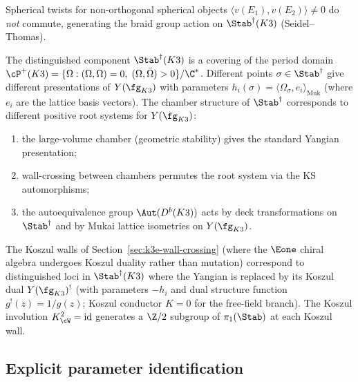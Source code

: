 Spherical twists for non-orthogonal spherical objects $\langle v(E_1), v(E_2) \rangle \neq 0$ do \emph{not} commute, generating the braid group action on $\Stab^\dagger(K3)$ (Seidel--Thomas).

\begin{conjecture}
\label{conj:stab-yangian-parameter}
\ClaimStatusConjectured
The distinguished component $\Stab^\dagger(K3)$ is a covering of the period domain $\cP^+(K3) = \{\Omega : (\Omega, \Omega) = 0, \; (\Omega, \bar\Omega) > 0\}/\C^*$. Different points $\sigma \in \Stab^\dagger$ give different presentations of $Y(\fg_{K3})$ with parameters $h_i(\sigma) = \langle \Omega_\sigma, e_i \rangle_{\mathrm{Muk}}$ (where $e_i$ are the lattice basis vectors). The chamber structure of $\Stab^\dagger$ corresponds to different positive root systems for $Y(\fg_{K3})$:
\begin{enumerate}[label=(\roman*)]
\item the large-volume chamber (geometric stability) gives the standard Yangian presentation;
\item wall-crossing between chambers permutes the root system via the KS automorphisms;
\item the autoequivalence group $\Aut(D^b(K3))$ acts by deck transformations on $\Stab^\dagger$ and by Mukai lattice isometries on $Y(\fg_{K3})$.
\end{enumerate}
\end{conjecture}

\begin{remark}
\label{rem:bridgeland-koszul-walls}
The Koszul walls of Section~\ref{sec:k3e-wall-crossing} (where the $\Eone$ chiral algebra undergoes Koszul duality rather than mutation) correspond to distinguished loci in $\Stab^\dagger(K3)$ where the Yangian is replaced by its Koszul dual $Y(\fg_{K3})^!$ (with parameters $-h_i$ and dual structure function $g^!(z) = 1/g(z)$; Koszul conductor $K = 0$ for the free-field branch). The Koszul involution $K_{\cW}^2 = \mathrm{id}$ generates a $\Z/2$ subgroup of $\pi_1(\Stab)$ at each Koszul wall.
\end{remark}



\subsection{Explicit parameter identification}
\label{subsec:stab-yangian-parameter-explicit}

